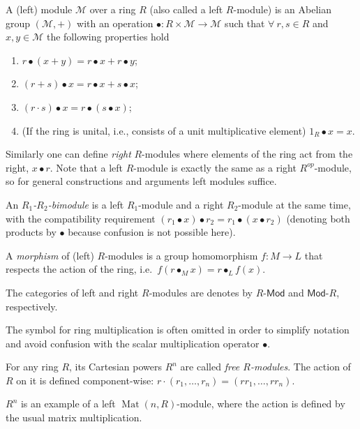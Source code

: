 \documentclass[english,letterpaper]{article}%
\numberwithin{equation}{section}
\numberwithin{figure}{section}
\numberwithin{table}{section}
\theoremstyle{definition}
\theoremstyle{definition}
\theoremstyle{definition}
\theoremstyle{plain}
\theoremstyle{plain}
\theoremstyle{plain}
\theoremstyle{plain}
\theoremstyle{remark}
\theoremstyle{remark}
\DeclareMathOperator{\Mat}{Mat}
\begin{document}
%
\begin{defn}
A (left) module $\mathcal{M}$ over a ring $R$ (also called a left
$R$-module) is an Abelian group $(\mathcal{M},+)$ with an operation
$\bullet:R\times\mathcal{M}\rightarrow\mathcal{M}$ such that $\forall~r,s\in R$
and $x,y\in\mathcal{M}$ the following properties hold 
\begin{enumerate}
\item $r\bullet(x+y)=r\bullet x+r\bullet y$;
\item $(r+s)\bullet x=r\bullet x+s\bullet x$;
\item $(r\cdot s)\bullet x=r\bullet(s\bullet x)$;
\item (If the ring is unital, i.e., consists of a unit multiplicative element)
$1_{R}\bullet x=x$. 
\end{enumerate}
Similarly one can define \emph{right} $R$-modules where elements
of the ring act from the right, $x\bullet r$. Note that a left $R$-module
is exactly the same as a right $R^{op}$-module, so for general constructions
and arguments left modules suffice.

An $R_{1}$\emph{-$R_{2}$-bimodule} is a left $R_{1}$-module and
a right $R_{2}$-module at the same time, with the compatibility requirement
$\left(r_{1}\bullet x\right)\bullet r_{2}=r_{1}\bullet\left(x\bullet r_{2}\right)$
(denoting both products by $\bullet$ because confusion is not possible
here).

A \emph{morphism} of (left) $R$-modules is a group homomorphism
$f:M\to L$ that respects the action of the ring, i.e.\ $f\left(r\bullet_{M}x\right)=r\bullet_{L}f\left(x\right)$.

The categories of left and right $R$-modules are denotes by $R\text{-}\mathsf{Mod}$
and $\mathsf{Mod}\text{-}R$, respectively.
\end{defn}
The symbol for ring multiplication is often omitted in order to simplify
notation and avoid confusion with the scalar multiplication operator
$\bullet$.
\begin{example}
For any ring $R$, its Cartesian powers $R^{n}$ are called \emph{free
$R$-modules}. The action of $R$ on it is defined component-wise:
$r\cdot\left(r_{1},\ldots,r_{n}\right)=\left(rr_{1},\ldots,rr_{n}\right)$.
\end{example}
%
\begin{example}
$R^{n}$ is an example of a left $\Mat\left(n,R\right)$-module,
where the action is defined by the usual matrix multiplication.
\end{example}
\end{document}
